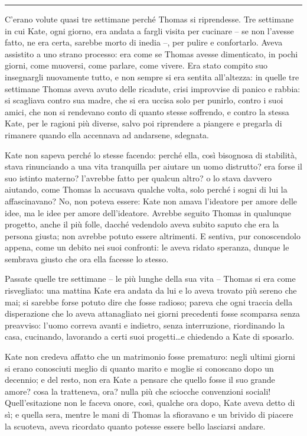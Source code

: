 \documentclass[a4paper,oneside,11pt]{memoir}
\begin{document}
\plainbreak{1}

C'erano volute quasi tre settimane perché Thomas si riprendesse. Tre settimane
in cui Kate, ogni giorno, era andata a fargli visita per cucinare -- se non
l'avesse fatto, ne era certa, sarebbe morto di inedia --, per pulire e
confortarlo. Aveva assistito a uno strano processo: era come se Thomas avesse
dimenticato, in pochi giorni, come muoversi, come parlare, come vivere. Era
stato compito suo insegnargli nuovamente tutto, e non sempre si era sentita
all'altezza: in quelle tre settimane Thomas aveva avuto delle ricadute, crisi
improvvise di panico e rabbia: si scagliava contro sua madre, che si era uccisa
solo per punirlo, contro i suoi amici, che non si rendevano conto di quanto
stesse soffrendo, e contro la stessa Kate, per le ragioni più diverse, salvo poi
riprendere a piangere e pregarla di rimanere quando ella accennava ad andarsene,
sdegnata.

Kate non sapeva perché lo stesse facendo: perché ella, così bisognosa di
stabilità, stava rinunciando a una vita tranquilla per aiutare un uomo
distrutto? era forse il suo istinto materno? l'avrebbe fatto per qualcun altro?
o lo stava davvero aiutando, come Thomas la accusava qualche volta, solo perché
i sogni di lui la affascinavano? No, non poteva essere: Kate non amava
l'ideatore per amore delle idee, ma le idee per amore dell'ideatore. Avrebbe
seguito Thomas in qualunque progetto, anche il più folle, dacché vedendolo aveva
subito saputo che era la persona giusta; non avrebbe potuto essere altrimenti. E
sentiva, pur conoscendolo appena, come un debito nei suoi confronti: le aveva
ridato speranza, dunque le sembrava giusto che ora ella facesse lo stesso.

Passate quelle tre settimane -- le più lunghe della sua vita -- Thomas si era
come risvegliato: una mattina Kate era andata da lui e lo aveva trovato più
sereno che mai; si sarebbe forse potuto dire che fosse radioso; pareva che ogni
traccia della disperazione che lo aveva attanagliato nei giorni precedenti fosse
scomparsa senza preavviso: l'uomo correva avanti e indietro, senza interruzione,
riordinando la casa, cucinando, lavorando a certi suoi progetti\dots e chiedendo
a Kate di sposarlo.

Kate non credeva affatto che un matrimonio fosse prematuro: negli ultimi giorni
si erano conosciuti meglio di quanto marito e moglie si conoscano dopo un
decennio; e del resto, non era Kate a pensare che quello fosse il suo grande
amore? cosa la tratteneva, ora? nulla più che sciocche convenzioni sociali!
Quell'esitazione non le faceva onore, così, qualche ora dopo, Kate aveva detto
di sì; e quella sera, mentre le mani di Thomas la sfioravano e un brivido di
piacere la scuoteva, aveva ricordato quanto potesse essere bello lasciarsi
andare.
\end{document}
